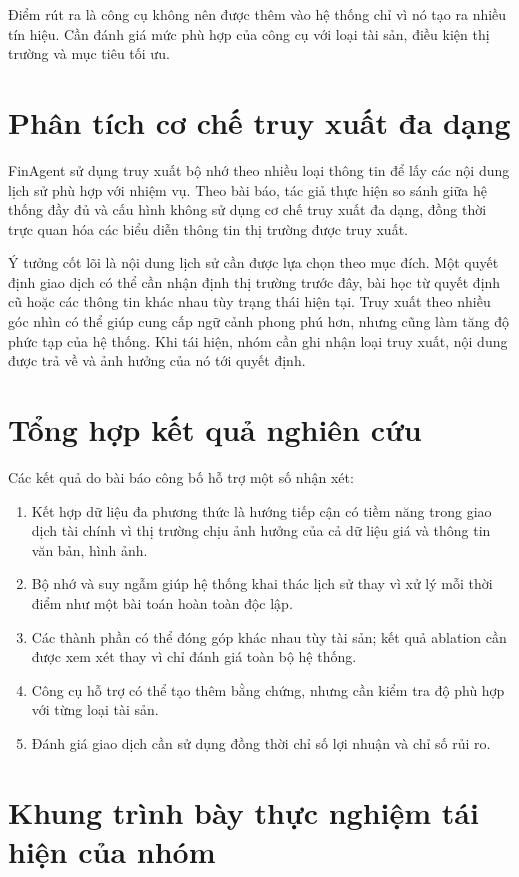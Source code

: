 Điểm rút ra là công cụ không nên được thêm vào hệ thống chỉ vì nó tạo ra nhiều tín hiệu. Cần đánh giá mức phù hợp của công cụ với loại tài sản, điều kiện thị trường và mục tiêu tối ưu.

\section{Phân tích cơ chế truy xuất đa dạng}

FinAgent sử dụng truy xuất bộ nhớ theo nhiều loại thông tin để lấy các nội dung lịch sử phù hợp với nhiệm vụ. Theo bài báo, tác giả thực hiện so sánh giữa hệ thống đầy đủ và cấu hình không sử dụng cơ chế truy xuất đa dạng, đồng thời trực quan hóa các biểu diễn thông tin thị trường được truy xuất.

Ý tưởng cốt lõi là nội dung lịch sử cần được lựa chọn theo mục đích. Một quyết định giao dịch có thể cần nhận định thị trường trước đây, bài học từ quyết định cũ hoặc các thông tin khác nhau tùy trạng thái hiện tại. Truy xuất theo nhiều góc nhìn có thể giúp cung cấp ngữ cảnh phong phú hơn, nhưng cũng làm tăng độ phức tạp của hệ thống. Khi tái hiện, nhóm cần ghi nhận loại truy xuất, nội dung được trả về và ảnh hưởng của nó tới quyết định.

\section{Tổng hợp kết quả nghiên cứu}

Các kết quả do bài báo công bố hỗ trợ một số nhận xét:
\begin{enumerate}
    \item Kết hợp dữ liệu đa phương thức là hướng tiếp cận có tiềm năng trong giao dịch tài chính vì thị trường chịu ảnh hưởng của cả dữ liệu giá và thông tin văn bản, hình ảnh.
    \item Bộ nhớ và suy ngẫm giúp hệ thống khai thác lịch sử thay vì xử lý mỗi thời điểm như một bài toán hoàn toàn độc lập.
    \item Các thành phần có thể đóng góp khác nhau tùy tài sản; kết quả ablation cần được xem xét thay vì chỉ đánh giá toàn bộ hệ thống.
    \item Công cụ hỗ trợ có thể tạo thêm bằng chứng, nhưng cần kiểm tra độ phù hợp với từng loại tài sản.
    \item Đánh giá giao dịch cần sử dụng đồng thời chỉ số lợi nhuận và chỉ số rủi ro.
\end{enumerate}

\section{Khung trình bày thực nghiệm tái hiện của nhóm}

